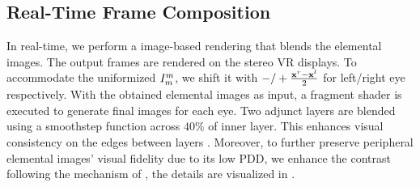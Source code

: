 \subsection{Real-Time Frame Composition}
\label{sec:method:blending}
In real-time, we perform a image-based rendering that blends the elemental images. The output frames are rendered on the stereo VR displays.
To accommodate the uniformized $I_{m}^m$, we shift it with $-/+ \frac{\mathbf{x}^r-\mathbf{x}^l}{2}$ for left/right eye respectively. 
{
With the obtained elemental images as input, a fragment shader is executed to generate final images for each eye. Two adjunct layers are blended using a smoothstep function across $40\%$ of inner layer.
}
This enhances visual consistency on the edges between layers \cite{Guenter:2012:F3G}.
Moreover, to further preserve peripheral elemental images' visual fidelity due to its low PDD, we enhance the contrast following the mechanism of \cite{Patney:2016:TFR}, the details are visualized in . %

